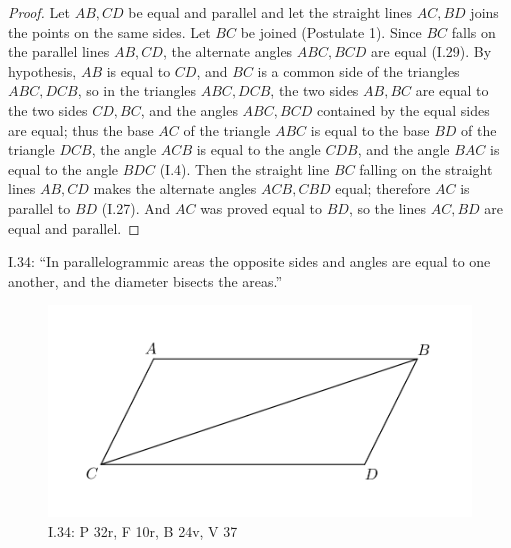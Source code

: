 \documentclass{article}
\begin{document}
\begin{proof}
Let $AB,CD$ be equal and parallel and let the straight lines $AC,BD$ joins the points on the same
sides. Let $BC$ be joined (Postulate 1). 
Since $BC$ falls on the parallel lines $AB,CD$, the alternate angles $ABC,BCD$ are equal
(I.29).
By hypothesis, $AB$ is equal to $CD$, and $BC$ is a common side of the triangles
$ABC,DCB$, so 
in the triangles $ABC,DCB$, the two sides $AB,BC$ are equal to the two
sides $CD,BC$, and the angles $ABC,BCD$ contained by the equal sides are equal; thus
the base $AC$ of the triangle $ABC$ is equal to the base $BD$ of the triangle $DCB$,
the angle $ACB$ is equal to the angle $CDB$, and the angle $BAC$ is equal to the angle $BDC$ (I.4).
Then the straight line $BC$ falling on the straight lines $AB,CD$ makes the alternate angles
$ACB,CBD$ equal; therefore $AC$ is parallel to $BD$ (I.27). And $AC$ was proved equal to $BD$, so
the lines $AC,BD$ are equal and parallel.
\end{proof}


I.34: ``In parallelogrammic areas the opposite sides and angles
are equal to one another, and the diameter bisects the areas.''

\begin{figure}
\begin{center}
\includegraphics{I34.png}
\end{center}
\caption{I.34: P 32r, F 10r, B 24v, V 37}
\label{I34}
\end{figure}
\end{document}
